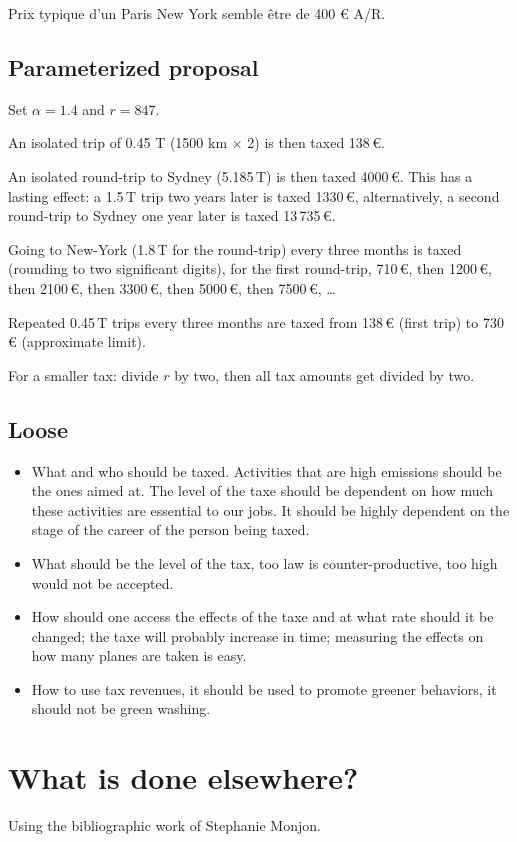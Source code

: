 \documentclass[version=3.21, pagesize, twoside=off, bibliography=totoc, DIV=calc, fontsize=12pt, a4paper, french, english]{scrartcl}
\begin{document}
Prix typique d’un Paris New York semble être de 400 € A/R.

\subsection{Parameterized proposal}
Set $α = 1.4$ and $r = 847$.

An isolated trip of 0.45 T (1500 km × 2)  is then taxed 138\,€.

An isolated round-trip to Sydney (5.185\,T) is then taxed 4000\,€. This has a lasting effect: a 1.5\,T trip two years later is taxed 1330\,€, alternatively, a second round-trip to Sydney one year later is taxed 13\,735\,€.

Going to New-York (1.8\,T for the round-trip) every three months is taxed (rounding to two significant digits), for the first round-trip, 710\,€, then 1200\,€, then 2100\,€, then 3300\,€, then 5000\,€, then 7500\,€, …

Repeated 0.45\,T trips every three months are taxed from 138\,€ (first trip) to 730\,€ (approximate limit).

For a smaller tax: divide $r$ by two, then all tax amounts get divided by two.

\subsection{Loose}
\begin{itemize}
\item What and who should be taxed. Activities that are high emissions should be the ones aimed at. The level of the taxe should be dependent on how much these activities are essential to our jobs. It should be highly dependent on the stage of the career of the person being taxed.
\item What should be the level of the tax, too law is counter-productive, too high would not be accepted.  
\item How should one access the effects of the taxe and at what rate should it be changed; the taxe will probably increase in time; measuring the effects on how many planes are taken is easy.  
\item How to use tax revenues, it should be used to promote greener behaviors, it should not be green washing. 
\end{itemize}

%

\appendix
\section{What is done elsewhere?} 
Using the bibliographic work of Stephanie Monjon. 
\end{document}
